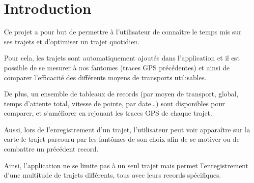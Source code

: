 \chapter{Introduction}


Ce projet a pour but de permettre à l’utilisateur de connaître le temps mis sur ses trajets et d’optimiser un trajet quotidien.

Pour cela, les trajets sont automatiquement ajoutés dans l’application et il est possible de se mesurer à nos \glspl{fantome} (traces \gls{GPS} précédentes) et ainsi de comparer l'efficacité des différents moyens de transports utilisables.

De plus, un ensemble de tableaux de records (par moyen de transport, global, temps d’attente total, vitesse de pointe, par date…) sont disponibles pour comparer, et s’améliorer en rejouant les traces \gls{GPS} de chaque trajet.

Aussi, lors de l’enregistrement d’un trajet, l’utilisateur peut voir apparaître sur la carte le trajet parcouru par les fantômes de son choix afin de se motiver ou de combattre un précédent record.

Ainsi, l’application ne se limite pas à un seul trajet mais permet l’enregistrement d’une multitude de trajets différents, tous avec leurs records spécifiques.
